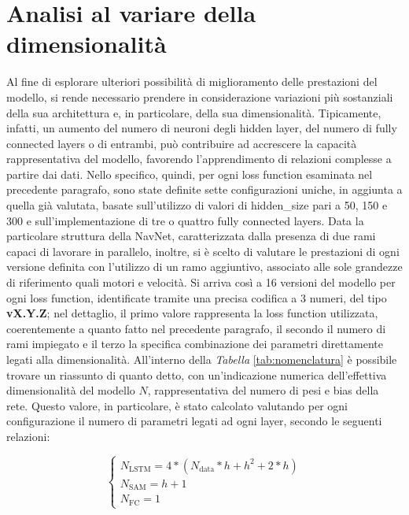 \section{Analisi al variare della dimensionalità}

Al fine di esplorare ulteriori possibilità di miglioramento delle prestazioni del modello, si rende necessario prendere in considerazione variazioni più sostanziali della sua architettura e, in particolare, della sua dimensionalità. Tipicamente, infatti, un aumento del numero di neuroni degli hidden layer, del numero di fully connected layers o di entrambi, può contribuire ad accrescere la capacità rappresentativa del modello, favorendo l'apprendimento di relazioni complesse a partire dai dati. Nello specifico, quindi, per ogni loss function esaminata nel precedente paragrafo, sono state definite sette configurazioni uniche, in aggiunta a quella già valutata, basate sull'utilizzo di valori di hidden\_size pari a 50, 150 e 300 e sull'implementazione di tre o quattro fully connected layers. Data la particolare struttura della NavNet, caratterizzata dalla presenza di due rami capaci di lavorare in parallelo, inoltre, si è scelto di valutare le prestazioni di ogni versione definita con l'utilizzo di un ramo aggiuntivo, associato alle sole grandezze di riferimento quali motori e velocità. Si arriva così a 16 versioni del modello per ogni loss function, identificate tramite una precisa codifica a 3 numeri, del tipo \textbf{vX.Y.Z}; nel dettaglio, il primo valore rappresenta la loss function utilizzata, coerentemente a quanto fatto nel precedente paragrafo, il secondo il numero di rami impiegato e il terzo la specifica combinazione dei parametri direttamente legati alla dimensionalità. All'interno della \emph{Tabella} \ref{tab:nomenclatura} è possibile trovare un riassunto di quanto detto, con un'indicazione numerica dell'effettiva dimensionalità del modello $N$, rappresentativa del numero di pesi e bias della rete. Questo valore, in particolare, è stato calcolato valutando per ogni configurazione il numero di parametri legati ad ogni layer, secondo le seguenti relazioni:

    \begin{equation}
        \begin{cases}
            N_{\text{LSTM}} = 4 * (N_{\text{data}}*h + h^{2} + 2*h) \\
            N_{\text{SAM}} = h + 1 \\
            N_{\text{FC}} = 1
        \end{cases}
    \end{equation}

